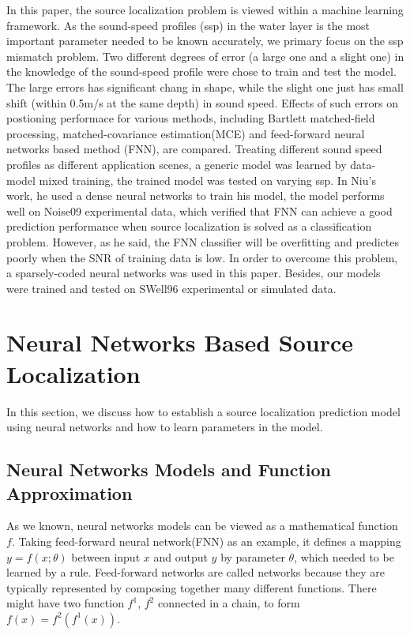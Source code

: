 In this paper, the source localization problem is viewed within a machine learning 
framework. As the sound-speed profiles (ssp) in the water layer is the most important parameter needed to be known accurately\cite{feuillade1989environmental}, we primary focus on the ssp
mismatch problem. 
Two different degrees of error (a large one and a slight one) in the knowledge of the sound-speed profile were chose to train and test the model.
The large errors has significant chang in shape, while the slight one just has small shift (within 0.5m/s at the same depth) in sound speed.
Effects of such errors on postioning performace for various methods, including Bartlett matched-field processing, matched-covariance estimation(MCE) and feed-forward neural networks based method (FNN), are compared.
Treating different sound speed profiles as different application scenes, a generic model was learned by data-model mixed training, the trained model was tested on 
varying ssp.
In Niu's work\cite{niu2017source}, he used a dense neural networks to train his model, the model performs well on Noise09 experimental data, which verified that FNN can achieve a good prediction performance when source localization is solved as a classification problem. However, as he said, the FNN classifier will be overfitting and predictes poorly when the SNR of training data is low. In order to overcome this problem, 
a sparsely-coded neural networks was used in this paper. Besides, our models were trained and tested on SWell96 experimental or simulated data.

\section{Neural Networks Based Source Localization}
In this section, we discuss how to establish a source localization prediction model using neural networks and how to learn parameters in the model.

\subsection{Neural Networks Models and Function Approximation}
As we known, neural networks models can be viewed as a mathematical function $f$. Taking feed-forward neural network(FNN) as an example, it defines a mapping ${{y}}=f(x;\theta )$ between input $x$ and output $y$ by parameter $\theta$, which needed to be learned by a rule. Feed-forward networks are called networks because they are typically represented by composing together many different functions. There might have two function $f^{1}$, $f^{2}$ connected in a chain\cite{goodfellow2016deep}, to form
$f(x) = f^{2}(f^{1}(x))$.

